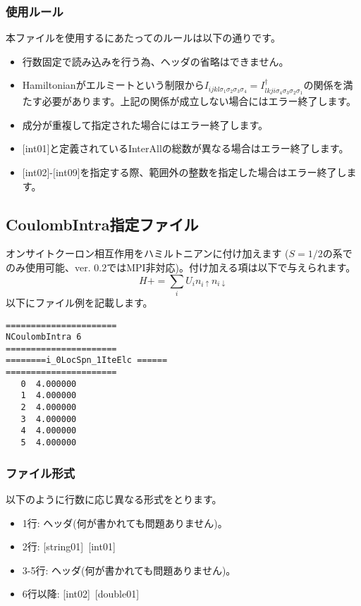 \subsubsection{使用ルール}
本ファイルを使用するにあたってのルールは以下の通りです。
\begin{itemize}
\item 行数固定で読み込みを行う為、ヘッダの省略はできません。
\item Hamiltonianがエルミートという制限から$I_{ijkl\sigma_1\sigma_2\sigma_3\sigma_4}=I_{lkji\sigma_4\sigma_3\sigma_2\sigma_1}^{\dag}$の関係を満たす必要があります。上記の関係が成立しない場合にはエラー終了します。
\item 成分が重複して指定された場合にはエラー終了します。
\item $[$int01$]$と定義されているInterAllの総数が異なる場合はエラー終了します。
\item $[$int02$]$-$[$int09$]$を指定する際、範囲外の整数を指定した場合はエラー終了します。
\end{itemize}


\newpage
\subsection{CoulombIntra指定ファイル}
\label{Subsec:coulombintra}
オンサイトクーロン相互作用をハミルトニアンに付け加えます{ ($S=1/2$の系でのみ使用可能、ver. 0.2ではMPI非対応)}。付け加える項は以下で与えられます。
\begin{equation}
H+=\sum_{i}U_i n_ {i \uparrow}n_{i \downarrow}
\end{equation}
以下にファイル例を記載します。

\begin{minipage}{12.5cm}
\begin{screen}
\begin{verbatim}
====================== 
NCoulombIntra 6  
====================== 
========i_0LocSpn_1IteElc ====== 
====================== 
   0  4.000000
   1  4.000000
   2  4.000000
   3  4.000000
   4  4.000000
   5  4.000000
\end{verbatim}
\end{screen}
\end{minipage}

\subsubsection{ファイル形式}
以下のように行数に応じ異なる形式をとります。
 \begin{itemize}
   \item  1行:  ヘッダ(何が書かれても問題ありません)。
   \item  2行:   [string01]~[int01]
   \item  3-5行:  ヘッダ(何が書かれても問題ありません)。
   \item  6行以降:
   [int02]~[double01] 
  \end{itemize}

